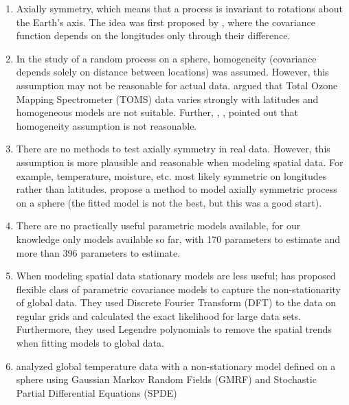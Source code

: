 
%
%
%
%
\begin{enumerate}

\item Axially symmetry, which means that a process is invariant to rotations about the Earth's axis. The idea was first proposed by \cite{Jones1963}, where the covariance function depends on the longitudes only through their difference.

\item In the study of a random process on a sphere, homogeneity (covariance depends solely on distance between locations) was assumed. However, this assumption may not be reasonable for actual data. \cite{Stein2007} argued that Total Ozone Mapping Spectrometer (TOMS) data varies strongly with latitudes and homogeneous models are not suitable. Further, \cite{CressieJohannesson2008}, \cite{JunStein2008}, \cite{BolinLindgren2011} pointed out that homogeneity assumption is not reasonable.   

\item There are no methods to test axially symmetry in real data. However, this assumption is more plausible and reasonable when modeling spatial data. For example, temperature, moisture, etc. most likely symmetric on longitudes rather than latitudes. \cite{Stein2007} propose a method to model axially symmetric process on a sphere (the fitted model is not the best, but this was a good start).

\item There are no practically useful parametric models available, for our knowledge only models available so far, \cite{stein1999} with 170 parameters to estimate and \cite{CressieJohannesson2008} more than 396 parameters to estimate.

\item When modeling spatial data stationary models are less useful;\cite{JunStein2008} has proposed flexible class of parametric covariance models to capture the non-stationarity of global data. They used Discrete Fourier Transform (DFT) to the data on regular grids and calculated the exact likelihood for large data sets. Furthermore, they used Legendre polynomials to remove the spatial trends when fitting models to global data.

\item \cite{Lindgren2011} analyzed global temperature data with a non-stationary model defined on a sphere using Gaussian Markov Random Fields (GMRF) and Stochastic Partial Differential Equations (SPDE)


\end{enumerate}
